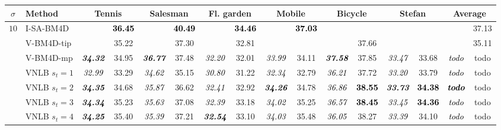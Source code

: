 \documentclass[10pt, journal, twocolumn, final, a4paper]{IEEEtran}
\newcommand{\bsic}[1]{\textcolor{black}{\textit{#1}}}
\newcommand{\Bsic}[1]{\textcolor{black}{\textbf{\textit{#1}}}}
\newcommand{\Best}[1]{\textbf{\textcolor{black}{#1}}}
\begin{document}
\begin{table}[htp!]
	\begin{center}
		{\small
		\renewcommand{\tabcolsep}{1.6mm}
		\renewcommand{\arraystretch}{1.3}
		\begin{tabular}{ c | l |c c | c c | c c | c c | c c | c c | c c}
			\hline
			\rule{0pt}{6pt}$\sigma$ & Method             & \multicolumn{2}{c}{Tennis}  & \multicolumn{2}{c}{Salesman} &\multicolumn{2}{c}{Fl. garden}& \multicolumn{2}{c}{Mobile}  & \multicolumn{2}{c}{Bicycle}  & \multicolumn{2}{c|}{Stefan} & \multicolumn{2}{c}{Average} \\\hline
			\multirow{1}{*}{$10$}
			                      & I-SA-BM4D            & \bsic{     } & \Best{36.45} & \bsic{     } & \Best{40.49}  & \bsic{     } & \Best{34.46}  & \bsic{     } & \Best{37.03} &              &               &              &              & \bsic{     } &       37.13  \\
			                      & V-BM4D-tip           & \bsic{     } &       35.22  & \bsic{     } &       37.30   & \bsic{     } &       32.81   &              &              &              &       37.66   &              &              & \bsic{     } &       35.11  \\
			                      & V-BM4D-mp            & \Bsic{34.32} &       34.95  & \Bsic{36.77} &       37.48   & \bsic{32.20} &       32.01   & \bsic{33.99} &       34.11  & \Bsic{37.58} &       37.85   & \bsic{33.47} &       33.68  & \bsic{todo } &       todo   \\
			                      & VNLB   $s_t = 1$     & \bsic{32.99} &       33.29  & \bsic{34.62} &       35.15   & \bsic{30.80} &       31.22   & \bsic{32.34} &       32.79  & \bsic{36.21} &       37.72   & \bsic{33.20} &       33.79  & \bsic{todo } &       todo   \\
										 & VNLB   $s_t = 2$     & \Bsic{34.35} &       34.68  & \bsic{35.87} &       36.62   & \bsic{32.41} &       32.92   & \Bsic{34.26} &       34.78  & \bsic{36.86} & \Best{38.55}  & \Bsic{33.73} & \Best{34.38} & \Bsic{todo } &       todo   \\
										 & VNLB   $s_t = 3$     & \Bsic{34.34} &       35.23  & \bsic{35.63} &       37.08   & \bsic{32.39} &       33.18   & \bsic{34.02} &       35.25  & \bsic{36.57} & \Best{38.45}  & \bsic{33.45} & \Best{34.36} & \bsic{todo } &       todo   \\
			                      & VNLB   $s_t = 4$     & \Bsic{34.25} &       35.40  & \bsic{35.39} &       37.21   & \Bsic{32.54} &       33.10   & \bsic{34.03} &       35.48  & \bsic{36.05} &       38.27   & \bsic{33.39} &       34.10  & \bsic{todo } &       todo   \\\hline

\end{tabular}}
\end{center}
\end{table}
\end{document}
